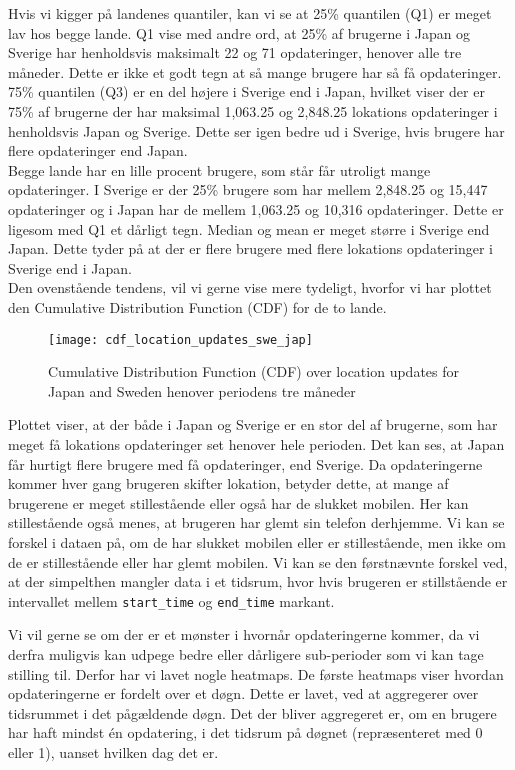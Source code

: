 Hvis vi kigger på landenes quantiler, kan vi se at 25\% quantilen (Q1) er meget lav hos begge lande. Q1 vise med andre ord, at 25\% af brugerne i Japan og Sverige har henholdsvis maksimalt 22 og 71 opdateringer, henover alle tre måneder. Dette er ikke et godt tegn at så mange brugere har så få opdateringer. 75\% quantilen (Q3) er en del højere i Sverige end i Japan, hvilket viser der er 75\% af brugerne der har maksimal 1,063.25 og 2,848.25 lokations opdateringer i henholdsvis Japan og Sverige. Dette ser igen bedre ud i Sverige, hvis brugere har flere opdateringer end Japan. \\ 

Begge lande har en lille procent brugere, som står får utroligt mange opdateringer. I Sverige er der 25\% brugere som har mellem 2,848.25 og 15,447 opdateringer og i Japan har de mellem 1,063.25 og 10,316 opdateringer. Dette er ligesom med Q1 et dårligt tegn. 
Median og mean er meget større i Sverige end Japan. Dette tyder på at der er flere brugere med flere lokations opdateringer i Sverige end i Japan. \\


Den ovenstående tendens, vil vi gerne vise mere tydeligt, hvorfor vi har plottet den Cumulative Distribution Function (CDF) for de to lande. 
\begin{figure}[H]
    \hspace*{-1.0cm}
    \centering
    \texttt{[image: cdf\_location\_updates\_swe\_jap]}
    \caption{Cumulative Distribution Function (CDF) over location updates for Japan and Sweden henover periodens tre måneder}
    \label{fig:country_cdf}
\end{figure}

Plottet viser, at der både i Japan og Sverige er en stor del af brugerne, som har meget få lokations opdateringer set henover hele perioden. Det kan ses, at Japan får hurtigt flere brugere med få opdateringer, end Sverige. 
Da opdateringerne kommer hver gang brugeren skifter lokation, betyder dette, at mange af brugerene er meget stillestående eller også har de slukket mobilen. Her kan stillestående også menes, at brugeren har glemt sin telefon derhjemme. Vi kan se forskel i dataen på, om de har slukket mobilen eller er stillestående, men ikke om de er stillestående eller har glemt mobilen. Vi kan se den førstnævnte forskel ved, at der simpelthen mangler data i et tidsrum, hvor hvis brugeren er stillstående er intervallet mellem \texttt{start\_time} og \texttt{end\_time} markant. 

Vi vil gerne se om der er et mønster i hvornår opdateringerne kommer, da vi derfra muligvis kan udpege bedre eller dårligere sub-perioder som vi kan tage stilling til. Derfor har vi lavet nogle heatmaps. 
De første heatmaps viser hvordan opdateringerne er fordelt over et døgn. Dette er lavet, ved at aggregerer over tidsrummet i det pågældende døgn. Det der bliver aggregeret er, om en brugere har haft mindst én opdatering, i det tidsrum på døgnet (repræsenteret med 0 eller 1), uanset hvilken dag det er.

